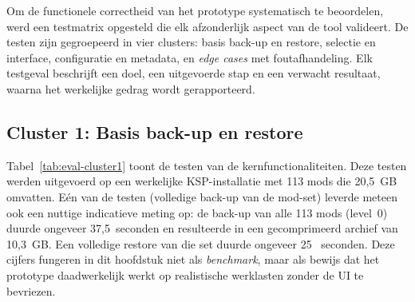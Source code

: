 Om de functionele correctheid van het prototype systematisch te beoordelen, werd een testmatrix opgesteld die elk afzonderlijk aspect van de tool valideert. De testen zijn gegroepeerd in vier clusters: basis back-up en restore, selectie en interface, configuratie en metadata, en \textit{edge cases} met foutafhandeling. Elk testgeval beschrijft een doel, een uitgevoerde stap en een verwacht resultaat, waarna het werkelijke gedrag wordt gerapporteerd.

\subsection{Cluster 1: Basis back-up en restore}

Tabel~\ref{tab:eval-cluster1} toont de testen van de kernfunctionaliteiten. Deze testen werden uitgevoerd op een werkelijke KSP-installatie met 113 mods die 20{,}5~GB omvatten. Eén van de testen (volledige back-up van de mod-set) leverde meteen ook een nuttige indicatieve meting op: de back-up van alle 113 mods (level~0) duurde ongeveer 37{,}5~seconden en resulteerde in een gecomprimeerd archief van 10{,}3~GB. Een volledige restore van die set duurde ongeveer 25~ seconden. Deze cijfers fungeren in dit hoofdstuk niet als \textit{benchmark}, maar als bewijs dat het prototype daadwerkelijk werkt op realistische werklasten zonder de UI te bevriezen.

